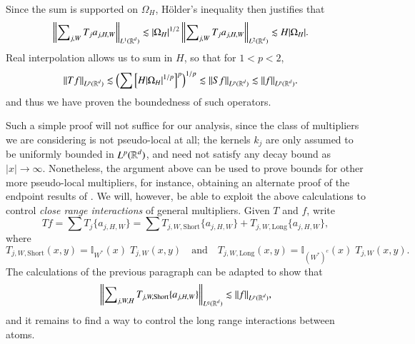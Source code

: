 %
%
%
Since the sum is supported on $\Omega_H$, H\"{o}lder's inequality then justifies that
%
\begin{equation}
\begin{split}
  \left\| \sum\nolimits_{j,W} T_j a_{j,H,W} \right\|_{L^1(\operatorname{\mathbb{R}}^d)} &\lesssim |\Omega_H|^{1/2} \left\| \sum\nolimits_{j,W} T_j a_{j,H,W} \right\|_{L^2(\operatorname{\mathbb{R}}^d)} \lesssim H |\Omega_H|.
\end{split}
\end{equation}
%
Real interpolation allows us to sum in $H$, so that for $1 < p < 2$,
%
\begin{equation}
\begin{split}
  \| Tf \|_{L^p(\operatorname{\mathbb{R}}^d)} &\lesssim \left( \sum \left[ H |\Omega_H|^{1/p} \right]^p \right)^{1/p} \lesssim \| S f \|_{L^p(\operatorname{\mathbb{R}}^d)} \lesssim \| f \|_{L^p(\operatorname{\mathbb{R}}^d)}.
\end{split}
\end{equation}
%
and thus we have proven the boundedness of such operators.

Such a simple proof will not suffice for our analysis, since the class of multipliers we are considering is not pseudo-local at all; the kernels $k_j$ are only assumed to be uniformly bounded in $L^p(\operatorname{\mathbb{R}}^d)$, and need not satisfy any decay bound as $|x| \to \infty$. Nonetheless, the argument above can be used to prove bounds for other more pseudo-local multipliers, for instance, obtaining an alternate proof of the endpoint results of \cite{SeegerSingular}. We will, however, be able to exploit the above calculations to control \emph{close range interactions} of general multipliers. Given $T$ and $f$, write
%
\begin{equation}
  Tf = \sum T_j \{ a_{j,H,W} \} = \sum T_{j,W,\text{Short}} \{ a_{j,H,W} \} + T_{j,W,\text{Long}} \{ a_{j,H,W} \},
\end{equation}
%
where
%
\begin{equation}
  T_{j,W,\text{Short}}(x,y) = \mathbb{I}_{W^*}(x)\; T_{j,W}(x,y) \quad\text{and}\quad T_{j,W,\text{Long}}(x,y) = \mathbb{I}_{(W^*)^c}(x)\; T_{j,W}(x,y).
\end{equation}
%
The calculations of the previous paragraph can be adapted to show that
%
\begin{equation}
  \left\| \sum\nolimits_{j,W,H} T_{j,W,\text{Short}} \{ a_{j,H,W} \} \right\|_{L^q(\operatorname{\mathbb{R}}^d)} \lesssim \| f \|_{L^p(\operatorname{\mathbb{R}}^d)},
\end{equation}
%
and it remains to find a way to control the long range interactions between atoms.

